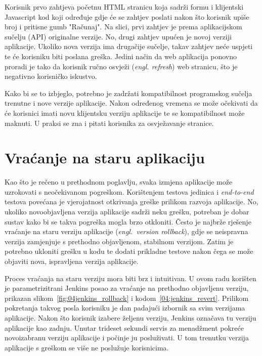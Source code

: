 Korisnik prvo zahtjeva početnu HTML stranicu koja sadrži formu i klijentski Javascript kod koji
određuje gdje će se zahtjev poslati nakon što korisnik upiše broj i pritisne gumb "Računaj". Na
slici, prvi zahtjev je prema aplikacijskom sučelju (API) originalne verzije. No, drugi zahtjev
upućen je novoj verziji aplikacije. Ukoliko nova verzija ima drugačije sučelje, takav zahtjev neće
uspjeti te će korisniku biti poslana greška. Jedini način da web aplikacija ponovno proradi je tako
da korisnik ručno osvježi (\textit{engl. refresh}) web stranicu, što je negativno korisničko
iskustvo.

Kako bi se to izbjeglo, potrebno je zadržati kompatibilnost programskog sučelja trenutne i nove
verzije aplikacije. Nakon određenog vremena se može očekivati da će korisnici imati novu klijentsku
verziju aplikacije te se kompatibilnost može maknuti. U praksi se zna i pitati korisnika za
osvježavanje stranice.

\section{Vraćanje na staru aplikaciju}
Kao što je rečeno u prethodnom poglavlju, svaka izmjena aplikacije može uzrokovati s neočekivanom
pogreškom. Korištenjem testova jedinica i \textit{end-to-end} testova povećana je vjerojatnost
otkrivanja greške prilikom razvoja aplikacije. No, ukoliko novoobjavljena verzija aplikacije sadrži
neku grešku, potreban je dobar sustav kako bi se takva pogreška mogla brzo otkloniti. Često je
najbrže rješenje vraćanje na staru verziju aplikacije (\textit{engl.~version rollback}), gdje se
neispravna verzija zamjenjuje s prethodno objavljenom, stabilnom verzijom. Zatim je potrebno
ukloniti grešku u kodu te dodati prikladne testove nakon čega se može objaviti nova, ispravljena
verzija aplikacije.

Proces vraćanja na staru verziju mora biti brz i intuitivan. U ovom radu korišten je
parametrizitrani Jenkins posao za vraćanje na prethodno objavljenu verziju, prikazan
slikom~\ref{fig:04jenkins_rollback} i kodom~\ref{04:jenkins_revert}. Prilikom pokretanja takvog
posla korisniku je dan padajući izbornik sa svim verzijama aplikacije. Nakon što korisnik izabere
željenu verziju, Jenkins označava tu verziju aplikacije kao zadnju. Unutar trideset sekundi servis
za menadžment pokreće novoizabranu verziju aplikacije i počinje ju posluživati. U tom trenutku
verzija aplikacije s greškom se više ne poslužuje korisnicima.

